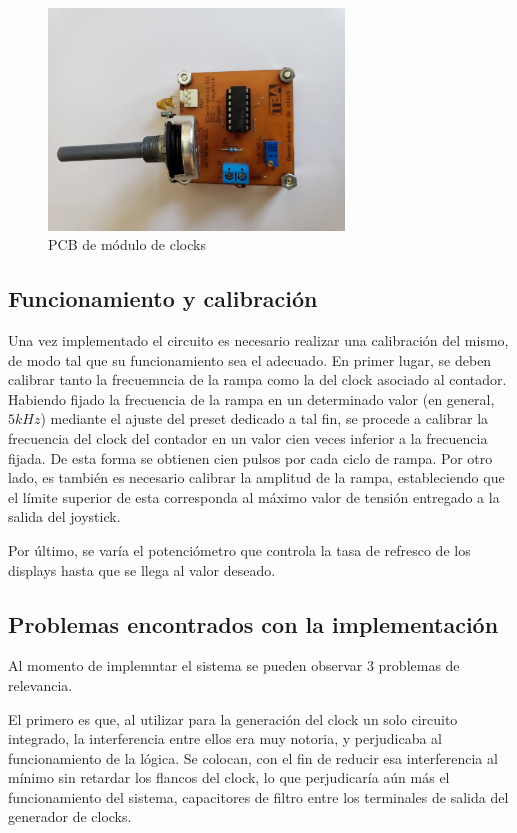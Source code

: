 \begin{figure}[H]
    \centering
    \includegraphics[width=0.7\textwidth]{../EJ8/Recursos/clocksPCB}
    \caption{\label{fig:BLOCK_DIAG}PCB de m\'odulo de clocks}
\end{figure}


\subsection{Funcionamiento y calibraci\'on}


Una vez implementado el circuito es necesario realizar una calibraci\'on del mismo, de modo tal que su funcionamiento sea el adecuado. En primer lugar, se deben calibrar tanto la frecuemncia de la rampa como la del clock asociado al contador. Habiendo fijado la frecuencia de la rampa en un determinado valor (en general, $5kHz$) mediante el ajuste del preset dedicado a tal fin, se procede a calibrar la frecuencia del clock del contador en un valor cien veces inferior a la frecuencia fijada. De esta forma se obtienen cien pulsos por cada ciclo de rampa. Por otro lado, es tambi\'en es necesario calibrar la amplitud de la rampa, estableciendo que el l\'imite superior de esta corresponda al m\'aximo valor de tensi\'on entregado a la salida del joystick.

Por \'ultimo, se var\'ia el potenci\'ometro que controla la tasa de refresco de los displays hasta que se llega al valor deseado.

\subsection{Problemas encontrados con la implementaci\'on}
Al momento de implemntar el sistema se pueden observar 3 problemas de relevancia.

El primero es que, al utilizar para la generaci\'on del clock un solo circuito integrado, la interferencia entre ellos era muy notoria, y perjudicaba al funcionamiento de la l\'ogica. Se colocan, con el fin de reducir esa interferencia al m\'inimo sin retardar los flancos del clock, lo que perjudicar\'ia a\'un m\'as el funcionamiento del sistema, capacitores de filtro entre los terminales de salida del generador de clocks.

